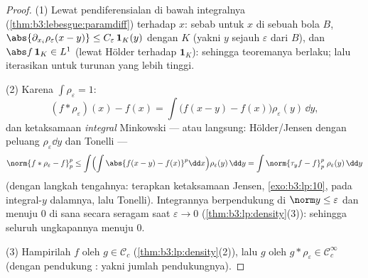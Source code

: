 \begin{proof}
(1) Lewat pendiferensialan di bawah integralnya
(\cref{thm:b3:lebesgue:paramdiff}) terhadap $x$: sebab untuk $x$ di sebuah bola
$B$, $\abs{\partial_{x_i}\rho_\varepsilon(x - y)} \leq
C_\varepsilon\,\mathbf 1_{K}(y)$ dengan $K$  (yakni $y$ sejauh
$\varepsilon$ dari $B$), dan $\abs f\,\mathbf 1_K \in L^1$
(lewat Hölder terhadap $\mathbf 1_K$): sehingga teoremanya berlaku;
lalu iterasikan untuk turunan yang lebih tinggi.

(2) Karena $\int\rho_\varepsilon = 1$:
\[
(f * \rho_\varepsilon)(x) - f(x)
= \int \bigl(f(x - y) - f(x)\bigr)\rho_\varepsilon(y)\,\dd y ,
\]
dan ketaksamaan \emph{integral} Minkowski --- atau langsung:
Hölder/Jensen dengan  peluang
$\rho_\varepsilon\dd y$ dan Tonelli ---
\[
\norm{f*\rho_\varepsilon - f}_p^p
\leq \int\Bigl(\int\abs{f(x-y) -
f(x)}^p\dd x\Bigr)\rho_\varepsilon(y)\,\dd y
= \int \norm{\tau_yf - f}_p^p\;\rho_\varepsilon(y)\,\dd y
\]
(dengan langkah tengahnya: terapkan ketaksamaan Jensen,
\cref{exo:b3:lp:10}, pada integral-$y$ dalamnya, lalu Tonelli).
Integrannya berpendukung di $\norm y \leq \varepsilon$ dan
menuju $0$ di sana secara seragam saat $\varepsilon \to 0$
(\cref{thm:b3:lp:density}(3)): sehingga seluruh ungkapannya menuju
$0$.

(3) Hampirilah $f$ oleh $g \in \mathcal C_c$
(\cref{thm:b3:lp:density}(2)), lalu $g$ oleh $g *
\rho_\varepsilon \in \mathcal C_c^\infty$ (dengan pendukung :
yakni jumlah pendukungnya).
\end{proof}

